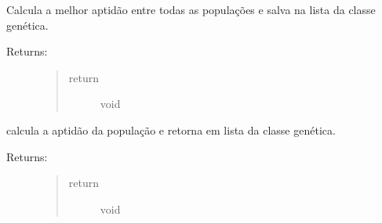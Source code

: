 \documentclass[letterpaper,10pt,english]{sphinxmanual}
\begin{document}
\begin{fulllineitems}
\begin{fulllineitems}
\end{fulllineitems}


\begin{fulllineitems}
\label{\detokenize{index:ga.Genetic.calculate_best_fitness}}
Calcula a melhor aptidão entre todas as populações e salva na lista da classe genética.
\begin{description}
\item[{Returns:}] \leavevmode\begin{quote}\begin{description}
\item[{return}] \leavevmode
void

\end{description}\end{quote}

\end{description}

\end{fulllineitems}


\begin{fulllineitems}
\label{\detokenize{index:ga.Genetic.calculate_pop_fitness}}
calcula a aptidão da população e retorna em lista da classe genética.
\begin{description}
\item[{Returns:}] \leavevmode\begin{quote}\begin{description}
\item[{return}] \leavevmode
void

\end{description}\end{quote}

\end{description}

\end{fulllineitems}



\end{fulllineitems}
\end{document}
